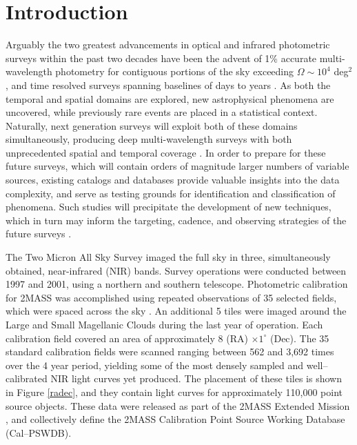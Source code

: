 \documentclass[]{emulateapj}
\begin{document}


\section{Introduction}
Arguably the two greatest advancements in optical and infrared photometric surveys within the past two decades have been the advent of 1\% accurate multi-wavelength photometry for contiguous portions of the sky exceeding $\Omega\sim10^4$ deg$^2$ \citep[e.g.][]{2mass,wise,dr8a}, and time resolved surveys spanning baselines of days to years  \citep[e.g.][]{ivezic2007,linear}. As both the temporal and spatial domains are explored, new astrophysical phenomena are uncovered, while previously rare events are placed in a statistical context. Naturally, next generation surveys will exploit both of these domains simultaneously, producing deep multi-wavelength surveys with both unprecedented spatial and temporal coverage \citep{panstarrs,lsst}. In order to prepare for these future surveys, which will contain orders of magnitude larger numbers of variable sources, existing catalogs and databases provide valuable insights into the data complexity, and serve as testing grounds for identification and classification of phenomena. Such studies will precipitate the development of new techniques, which in turn may inform the targeting, cadence, and observing strategies of the future surveys \cite[e.g.][]{oluseyi2012}.


The Two Micron All Sky Survey \citep[2MASS;][]{2mass} imaged the full sky in three, simultaneously obtained, near-infrared (NIR) bands. Survey operations were conducted between 1997 and 2001, using a northern and southern telescope. Photometric calibration for 2MASS was accomplished using repeated observations of 35 selected fields, which were spaced across the sky \citep{nikolaev2000}. An additional 5 tiles were imaged around the Large and Small Magellanic Clouds during the last year of operation. Each calibration field covered an area of approximately 8 (RA) $\times 1^\circ$ (Dec). The 35 standard calibration fields were scanned ranging between 562 and 3,692 times over the 4 year period, yielding some of the most densely sampled and well--calibrated NIR light curves yet produced. The placement of these tiles is shown in Figure \ref{radec}, and they contain light curves for approximately 110,000 point source objects.  These data were released as part of the 2MASS Extended Mission \citep{cutri2006}, and collectively define the 2MASS Calibration Point Source Working Database (Cal--PSWDB).
\end{document}
